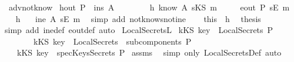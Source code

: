\begin{isabellebody}
\isamarkupfalse%
%
\endisatagproof
{\isafoldproof}%
%
\isadelimproof
\isanewline
%
\endisadelimproof
\isanewline
{}\isamarkupfalse%
\ \ adv{\isacharunderscore}not{\isacharunderscore}know{}{\isacharcolon}\isanewline
{}\ h{}{\isacharcolon}{\isachardoublequoteopen}out\ P\ {\isasymsubseteq}\ ins\ A{\isachardoublequoteclose}\isanewline
\ \ \ \ \ \ \ \ h{}{\isacharcolon}{\isachardoublequoteopen}{\isasymnot}\ know\ A\ {\isacharparenleft}sKS\ m{\isacharparenright}{\isachardoublequoteclose}\isanewline
{}\ \ \ \ {\isachardoublequoteopen}{\isasymnot}\ eout\ P\ {\isacharparenleft}sE\ m{\isacharparenright}{\isachardoublequoteclose}\isanewline
%
\isadelimproof
%
\endisadelimproof
%
\isatagproof
{}\isamarkupfalse%
\ {\isacharminus}\isanewline
\ \ \isamarkupfalse%
\ h{}\ \isamarkupfalse%
\ {\isachardoublequoteopen}{\isasymnot}\ ine\ A\ {\isacharparenleft}sE\ m{\isacharparenright}{\isachardoublequoteclose}\ \isamarkupfalse%
\ {\isacharparenleft}simp\ add{\isacharcolon}\ not{\isacharunderscore}know{\isacharunderscore}s{\isacharunderscore}not{\isacharunderscore}ine{\isacharparenright}\isanewline
\ \ \isamarkupfalse%
\ this\ \ h{}\ \isamarkupfalse%
\ {\isacharquery}thesis\ \isamarkupfalse%
\ {\isacharparenleft}simp\ add{\isacharcolon}\ ine{\isacharunderscore}def\ eout{\isacharunderscore}def{\isacharcomma}\ auto{\isacharparenright}\isanewline
{}\isamarkupfalse%
%
\endisatagproof
{\isafoldproof}%
%
\isadelimproof
\isanewline
%
\endisadelimproof
\isanewline
{}\isamarkupfalse%
\ LocalSecrets{\isacharunderscore}L{}{\isacharcolon}\isanewline
{}\ {\isachardoublequoteopen}{\isacharparenleft}kKS{\isacharparenright}\ key\ {\isasymin}\ LocalSecrets\ P{\isachardoublequoteclose}\ \ \isanewline
\ \ \ \ \ \ \ \ {\isachardoublequoteopen}{\isacharparenleft}kKS\ key{\isacharparenright}\ {\isasymnotin}\ {\isasymUnion}{\isacharparenleft}LocalSecrets\ {\isacharbackquote}\ subcomponents\ P{\isacharparenright}{\isachardoublequoteclose}\isanewline
{}\ \ \ \ {\isachardoublequoteopen}kKS\ key\ {\isasymnotin}\ specKeysSecrets\ P{\isachardoublequoteclose}\isanewline
%
\isadelimproof
%
\endisadelimproof
%
\isatagproof
{}\isamarkupfalse%
\ assms\ \isamarkupfalse%
\ {\isacharparenleft}simp\ only{\isacharcolon}\ LocalSecretsDef{\isacharcomma}\ auto{\isacharparenright}%

\end{isabellebody}
